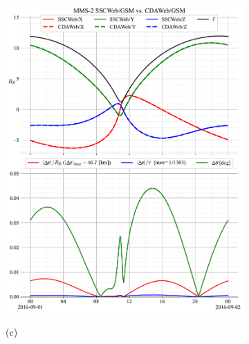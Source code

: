 \documentclass[draft]{agujournal2019}
\begin{document}
\begin{figure}[h]
\begin{subfigure}[b]{0.49\textwidth}
         \includegraphics[width=\textwidth]{code/figures/ephemeris/MMS-2_SSCWeb-GSM_vs_CDAWeb-GSM.pdf}
     \end{subfigure}
     \par\bigskip\bigskip
     \begin{subfigure}[b]{0.49\textwidth}
         (c)
         \centering

\end{subfigure}
\end{figure}
\end{document}
